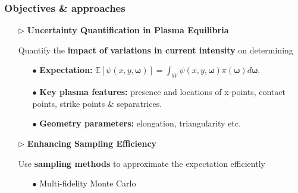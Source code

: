 \documentclass{beamer}
\begin{document}
\begin{frame}[t]
    \frametitle{Objectives \& approaches}
        \begin{itemize}[leftmargin=5pt] 
            
            \item[$\triangleright$] \textcolor{myblue3}{\bf Uncertainty Quantification in Plasma Equilibria} 
            
            {\fontsize{9}{9}\selectfont
            Quantify the {\bf impact of variations in current intensity} on determining 
            \begin{itemize}[leftmargin=15pt]     
                \item[\textcolor{myblue3}{$\bullet$}]   {\bf Expectation:}
                $\mathbb{E}\left[\psi(x,y,\boldsymbol \omega)\right]=\int_W \psi(x,y,\boldsymbol{\omega})\pi(\boldsymbol\omega)d\boldsymbol{\omega}.$
            
                \vspace{0.5mm}
                \item[\textcolor{myblue3}{$\bullet$}] {\bf Key plasma features:}  presence and locations of x-points, contact points, strike points \& separatrices.

                \vspace{0.5mm}
                \item[\textcolor{myblue3}{$\bullet$}]  {\bf Geometry parameters:} elongation, triangularity etc.
                
            \end{itemize}
            }
            \vspace{2mm}
            \item[$\triangleright$] \textcolor{myblue3}{\bf Enhancing Sampling Efficiency}
            
            {\fontsize{9}{9}\selectfont
            Use {\bf sampling methods} to approximate the expectation efficiently
            \begin{itemize}[leftmargin=15pt] 
                \item[\textcolor{myblue3}{$\bullet$}] \textcolor{myblue3}{Multi-fidelity Monte Carlo}
                

\end{itemize}}
\end{itemize}
\end{frame}
\end{document}
